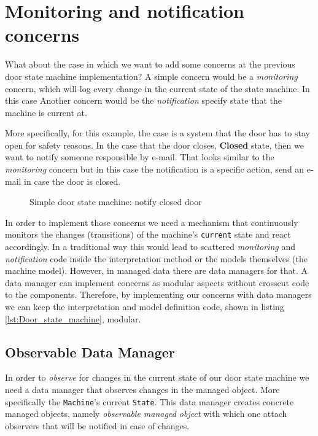\section{Monitoring and notification concerns}
What about the case in which we want to add some concerns at the previous door state machine implementation?
A simple concern would be a \textit{monitoring} concern, which will log every change in the current state of the state machine.
In this case 
Another concern would be the \textit{notification} specify state that the machine is current at.

More specifically, for this example, the case is a system that the door has to stay open for safety reasons. 
In the case that the door closes, \textbf{Closed} state, then we want to notify someone responsible by e-mail.
That looks similar to the \textit{monitoring} concern but in this case the notification is a specific action, send an e-mail in case the door is closed.

\begin{figure}[H]
	\centering
  	\caption{Simple door state machine: notify closed door}
  	\label{fig:State_machine_danger}
\end{figure}

In order to implement those concerns we need a mechanism that continuously monitors the changes (transitions) of the machine's \texttt{current} state and react accordingly.
In a traditional way this would lead to scattered \textit{monitoring} and \textit{notification} code inside the interpretation method or the models themselves (the machine model).
However, in managed data there are data managers for that.
A data manager can implement concerns as modular aspects without crosscut code to the components.
Therefore, by implementing our concerns with data managers we can keep the interpretation and model definition code, shown in listing \ref{lst:Door_state_machine}, modular.

\subsection{Observable Data Manager}
In order to \textit{observe} for changes in the current state of our door state machine we need a data manager that observes changes in the managed object.
More specifically the \texttt{Machine}'s current \texttt{State}.
This data manager creates concrete managed objects, namely \textit{observable managed object} with which one attach observers that will be notified in case of changes.

